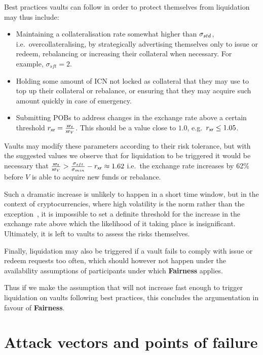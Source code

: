Best practices vaults can follow in order to protect themselves from liquidation may thus include:
\begin{itemize}
    \item Maintaining a collateralisation rate somewhat higher than $\sigma_{std}$, i.e.\ overcollateralising, by strategically advertising themselves only to issue or redeem, rebalancing or increasing their collateral when necessary.
    For example, $\sigma_{sft} = 2$.
    \item Holding some amount of ICN not locked as collateral that they may use to top up their collateral or rebalance, or ensuring that they may acquire such amount quickly in case of emergency.
    \item Submitting POBs to address changes in the exchange rate above a certain threshold $r_{\mathsf{xr}} = \frac{\mathsf{xr}_t}{\mathsf{xr}_V}$.
    This should be a value close to $1.0$, e.g.\ $r_{\mathsf{xr}} \leq 1.05$.
\end{itemize}

Vaults may modify these parameters according to their risk tolerance, but with the suggested values we observe that for liquidation to be triggered it would be necessary that $\frac{\mathsf{xr}_t}{\mathsf{xr}_V} > \frac{\sigma_{sft}}{\sigma_{min}} - r_{\mathsf{xr}} \approx 1.62$ i.e.\ the exchange rate increases by 62\% before $V$ is able to acquire new funds or rebalance.

Such a dramatic increase is unlikely to happen in a short time window, but in the context of cryptocurrencies, where high volatility is the norm rather than the exception~\cite{Lahmiri2018LongrangeMDvolatility,CAPORALE2019143volatility}, it is impossible to set a definite threshold for the increase in the exchange rate above which the likelihood of it taking place is insignificant.
Ultimately, it is left to vaults to assess the risks themselves.

Finally, liquidation may also be triggered if a vault fails to comply with issue or redeem requests too often, which should however not happen under the availability assumptions of participants under which \textbf{Fairness} applies.

Thus if we make the assumption that \xr will not increase fast enough to trigger liquidation on vaults following best practices, this concludes the argumentation in favour of \textbf{Fairness}.

\section{Attack vectors and points of failure}
\label{sec:attack_vs}

